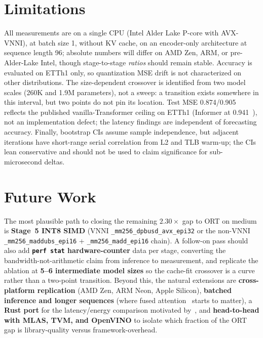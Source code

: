 \documentclass{article}
\begin{document}
\section{Limitations}
\label{sec:limitations}

All measurements are on a single CPU (Intel Alder Lake P-core with AVX-VNNI), at batch size 1, without KV cache, on an encoder-only architecture at sequence length 96; absolute numbers will differ on AMD Zen, ARM, or pre-Alder-Lake Intel, though stage-to-stage \emph{ratios} should remain stable.
Accuracy is evaluated on ETTh1 only, so quantization MSE drift is not characterized on other distributions.
The size-dependent crossover is identified from two model scales (260K and 1.9M parameters), not a sweep: a transition exists somewhere in this interval, but two points do not pin its location.
Test MSE 0.874/0.905 reflects the published vanilla-Transformer ceiling on ETTh1 (Informer at 0.941~\citep{nie2023patchtst}), not an implementation defect; the latency findings are independent of forecasting accuracy.
Finally, bootstrap CIs assume sample independence, but adjacent iterations have short-range serial correlation from L2 and TLB warm-up; the CIs lean conservative and should not be used to claim significance for sub-microsecond deltas.

\section{Future Work}
\label{sec:future}

The most plausible path to closing the remaining $2.30\times$ gap to ORT on medium is \textbf{Stage~5 INT8 SIMD} (VNNI \texttt{\_mm256\_dpbusd\_avx\_epi32} or the non-VNNI \texttt{\_mm256\_maddubs\_epi16} + \texttt{\_mm256\_madd\_epi16} chain).
A follow-on pass should also add \textbf{\texttt{perf stat} hardware-counter} data per stage, converting the bandwidth-not-arithmetic claim from inference to measurement, and replicate the ablation at \textbf{5--6 intermediate model sizes} so the cache-fit crossover is a curve rather than a two-point transition.
Beyond this, the natural extensions are \textbf{cross-platform replication} (AMD Zen, ARM Neon, Apple Silicon), \textbf{batched inference and longer sequences} (where fused attention~\citep{dao2022flashattention} starts to matter), a \textbf{Rust port} for the latency/energy comparison motivated by~\citet{pereira2021ranking}, and \textbf{head-to-head with MLAS, TVM, and OpenVINO} to isolate which fraction of the ORT gap is library-quality versus framework-overhead.
\end{document}
